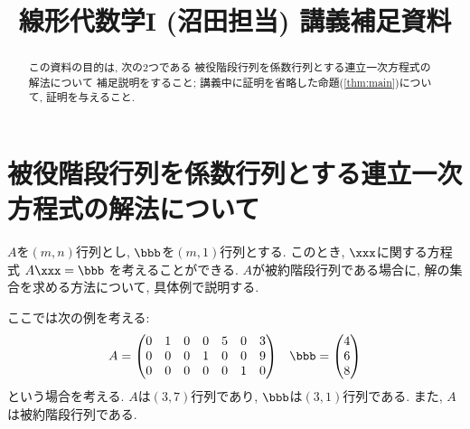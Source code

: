 \title{線形代数学I (沼田担当) 講義補足資料}
\author{}
\date{}
\maketitle

\begin{abstract}
  この資料の目的は, 次の2つである
  被役階段行列を係数行列とする連立一次方程式の解法について
  補足説明をすること;
  講義中に証明を省略した命題(\cref{thm:main})について,
証明を与えること.
\end{abstract}

\section{被役階段行列を係数行列とする連立一次方程式の解法について}
$A$を$(m,n)$行列とし, $\bbb$を$(m,1)$行列とする.
このとき, $\xxx$に関する方程式
$A\xxx=\bbb$
を考えることができる.
$A$が被約階段行列である場合に,
解の集合を求める方法について,
具体例で説明する.

ここでは次の例を考える:
\begin{align*}
  A&=
  \begin{pmatrix}
    0&1&0&0&5&0&3\\
    0&0&0&1&0&0&9\\
    0&0&0&0&0&1&0
  \end{pmatrix}
  &
  \bbb=
  \begin{pmatrix}
    4\\
    6\\
    8
  \end{pmatrix}
\end{align*}
という場合を考える.
$A$は$(3,7)$行列であり,
$\bbb$は$(3,1)$行列である.
また, $A$は被約階段行列である.

